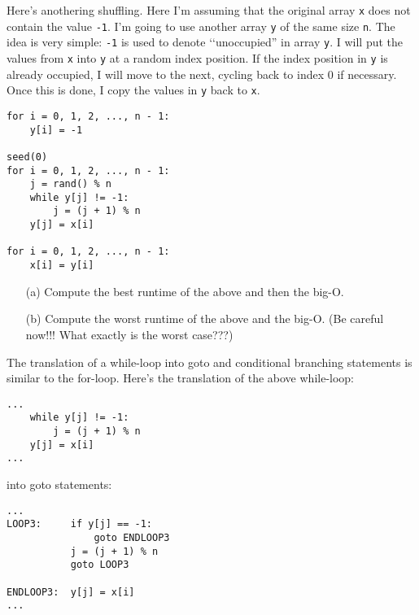   Here's anothering shuffling.
  Here I'm assuming that
the original array \verb!x! does not contain the value \verb!-1!.
I'm going to use another array \verb!y! of the same size \verb!n!.
The idea is very simple: \verb!-1! is used to denote
\lq\lq unoccupied'' in array \verb!y!.
I will put the values from \verb!x! into \verb!y!
at a random index position.
If the index position in \verb!y! is already occupied,
I will move to the next, cycling back to index 0 if necessary.
Once this is done, I copy the values in \verb!y! back to \verb!x!.
\begin{Verbatim}[frame=single, fontsize=\footnotesize]
for i = 0, 1, 2, ..., n - 1:
    y[i] = -1

seed(0)
for i = 0, 1, 2, ..., n - 1:
    j = rand() % n
    while y[j] != -1:
        j = (j + 1) % n
    y[j] = x[i]

for i = 0, 1, 2, ..., n - 1:
    x[i] = y[i]
\end{Verbatim}
\begin{enumerate}
\item[(a)] Compute the best runtime of the above and then the big-O.
\item[(b)] Compute the worst runtime of the above and the big-O.
(Be careful now!!! What exactly is the worst case???)
\end{enumerate}
The translation of a while-loop into
goto and conditional branching statements is similar to the 
for-loop. Here's the translation of the above while-loop:
\begin{Verbatim}[frame=single, fontsize=\footnotesize]
...
    while y[j] != -1:
        j = (j + 1) % n
    y[j] = x[i]
...
\end{Verbatim}
into goto statements:
\begin{Verbatim}[frame=single, fontsize=\footnotesize]
...
LOOP3:     if y[j] == -1:
               goto ENDLOOP3
           j = (j + 1) % n
           goto LOOP3

ENDLOOP3:  y[j] = x[i]
...
\end{Verbatim}
